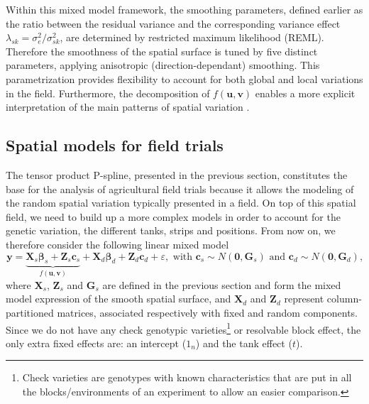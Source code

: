 Within this mixed model framework, the smoothing parameters, defined earlier as the ratio between the residual variance and the
corresponding variance effect $\lambda_{sk} = \sigma^2_{e} / \sigma^2_{sk}$, are determined by restricted maximum likelihood (REML). Therefore the smoothness of the spatial surface is tuned by five distinct parameters, applying anisotropic (direction-dependant) smoothing. This parametrization provides flexibility to account for both global and local variations in the field. Furthermore, the decomposition of $f(\mathbf{u},\mathbf{v})$ enables a more explicit interpretation of the main patterns of spatial variation \parencite{rodriguez-alvarez_correcting_2018}.





\subsection{Spatial models for field trials}
The tensor product P-spline, presented in the previous section, constitutes the base for the analysis of agricultural field trials because it allows the modeling of the random spatial variation typically presented in a field. 
On top of this spatial field, we need to build up a more complex models in order to account for the genetic variation, the different tanks, strips and positions. From now on, we therefore consider the following linear mixed model
\begin{equation}
    \boldsymbol{y}=
    \underbrace{
    	\boldsymbol{X}_{s} \boldsymbol{\beta}_{s}+
    	\boldsymbol{Z}_{s} \boldsymbol{c}_{s}
    	}_{f(\boldsymbol{u}, \boldsymbol{v})}+
    \boldsymbol{X}_{d} \boldsymbol{\beta}_{d}+
    \boldsymbol{Z}_{d} \boldsymbol{c}_{d}+
    \varepsilon, 
    \text { with } 
    \boldsymbol{c}_{s} \sim N\left(\mathbf{0}, \boldsymbol{G}_{s}\right) 
    \text { and } 
    \boldsymbol{c}_{d} \sim N\left(\mathbf{0}, \boldsymbol{G}_{d}\right)
    \text{,}
    \label{eq:full_random_and_additonal_effects_model}
\end{equation}
where $\boldsymbol{X}_{s}$, $\boldsymbol{Z}_{s}$ and $\boldsymbol{G}_{s}$ are defined in the previous section and form the mixed model expression of the smooth spatial surface, and $\boldsymbol{X}_{d}$ and $\boldsymbol{Z}_{d}$ represent column-partitioned matrices, associated respectively with fixed and random components. Since we do not have any check genotypic varieties\footnote{Check varieties are genotypes with known characteristics that are put in all the blocks/environments of an experiment to allow an easier comparison.} or resolvable block effect, the only extra fixed effects are: an intercept ($1_n$) and the tank effect ($t$). 
